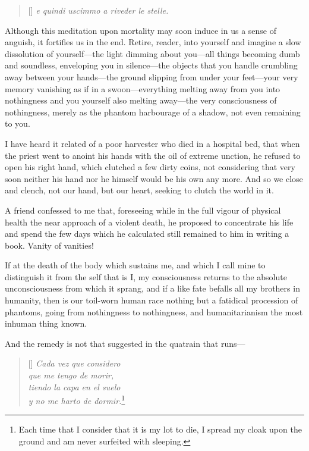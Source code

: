 \settowidth{}
\begin{verse}[\versewidth]
\textit{e quindi uscimmo a riveder le stelle.}
\end{verse}

Although this meditation upon mortality may soon induce in us a sense
of anguish, it fortifies us in the end. Retire, reader, into yourself
and imagine a slow dissolution of your\-self---the light dimming about
you---all things becoming dumb and soundless, enveloping you in
silence---the objects that you handle crumbling away between your
hands---the ground slipping from under your feet---your very memory
vanishing as if in a swoon---eve\-ry\-thing melting away from you into
nothingness and you yourself also melting a\-way---the very
consciousness of nothingness, merely as the phantom harbourage of a
shadow, not even remaining to you.

I have heard it related of a poor harvester who died in a hospital
bed, that when the priest went to anoint his hands with the oil of
extreme unction, he refused to open his right hand, which clutched a
few dirty coins, not considering that very soon neither his hand nor
he himself would be his own any more. And so we close and clench, not
our hand, but our heart, seeking to clutch the world in it.

A friend confessed to me that, foreseeing while in the full vigour of
physical health the near approach of a violent death, he proposed to
concentrate his life and spend the few days which he calculated still
remained to him in writing a book. Vanity of vanities!

If at the death of the body which sustains me, and which I call mine
to distinguish it from the self that is I, my consciousness returns to
the absolute unconsciousness from which it sprang, and if a like fate
befalls all my brothers in humanity, then is our toil-worn human race
nothing but a fatidical procession of phantoms, going from nothingness
to nothingness, and humanitarianism the most inhuman thing known.

And the remedy is not that suggested in the quatrain that
runs---

\settowidth{}
\begin{verse}[\versewidth]
\textit{Cada vez que considero\\
que me tengo de morir,\\
tiendo la capa en el suelo\\
y no me harto de dormir.}\footnote{Each time that I consider that it
is my lot to die, I spread my cloak upon the ground and am never
surfeited with sleeping.}
\end{verse}

